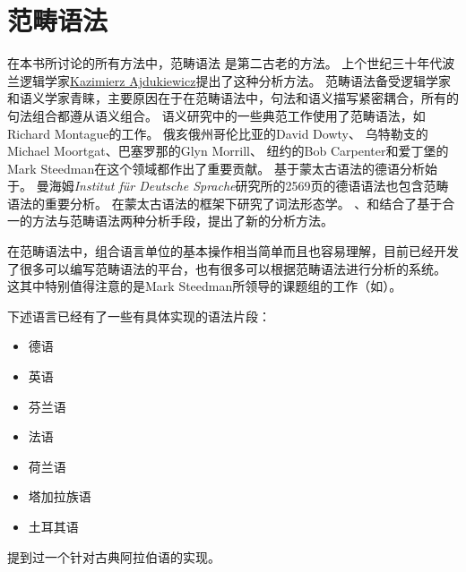 
\chapter{范畴语法}
\label{Kapitel-CG}\label{chap-CG}

在本书所讨论的所有方法中，范畴语法
是第二古老的方法。
上个世纪三十年代波兰逻辑学家\href{http://en.wikipedia.org/wiki/Kazimierz_Ajdukiewicz}{Kazimierz Ajdukiewicz}提出了这种分析方法\citep{Ajdukiewicz35a-u}。
范畴语法备受逻辑学家和语义学家青睐，主要原因在于在范畴语法中，句法和语义描写紧密耦合，所有的句法组合都遵从语义组合。
语义研究中的一些典范工作使用了范畴语法，如Richard Montague\citeyearpar{Montague74a-u}的工作。
俄亥俄州哥伦比亚的David Dowty\citeyearpar{Dowty79a}、 
乌特勒支的Michael Moortgat\citeyearpar{Moortgat89a-u}、巴塞罗那的Glyn Morrill\citeyearpar{Morrill94a-u}、
纽约的Bob Carpenter\citeyearpar{Carpenter98a-u}和爱丁堡的Mark Steedman\citeyearpar{Steedman91a,Steedman97a,Steedman2000a-u}在这个领域都作出了重要贡献。
基于蒙太古语法的德语分析始于。
曼海姆\emph{Institut für Deutsche Sprache}研究所的2569页的德语语法\citep*{IDS97-not-crossreferenced}也包含范畴语法的重要分析。
\citet{Fanselow81a-u}在蒙太古语法的框架下研究了词法形态学。
\citet{Uszkoreit86d}、\citet{Karttunen86a,Karttunen89a-u}和\citet*{CKZ88a}结合了基于合一的方法与范畴语法两种分析手段，提出了新的分析方法。

在范畴语法中，组合语言单位的基本操作相当简单而且也容易理解，目前已经开发了很多可以编写范畴语法的平台，也有很多可以根据范畴语法进行分析的系统\citep*{YK90a-u,Carpenter1994a-u,BvN94a-u,Llore1995a-u,KoenigE99a-u,Moot2002a-u,WB2003a-u,BCPW2007a,Morrill2012a}。
这其中特别值得注意的是Mark Steedman所领导的课题组的工作（如\citealp*{CHS2002a-u,CC2007a-u}）。

下述语言已经有了一些有具体实现的语法片段：
\begin{itemize}
\item 德语\citep*{Uszkoreit86d,KoenigE99a-u,VHE2003a,VTBS2011a}
\item 英语 \citep{Villavicencio2002a,Baldridge2002a-u,Beavers2002a-u,Beavers2004a-u}
\item 芬兰语 \citep{Karttunen89a-u}
\item 法语 \citep*{BBCG87a-u}
\item 荷兰语 \citep{BvN94a-u,Baldridge2002a-u}
\item 塔加拉族语 \citep{Baldridge2002a-u}
\item 土耳其语 \citep{Hoffmann95a-u,Baldridge2002a-u}
\end{itemize}
\citet*[]{BCPW2007a}提到过一个针对古典阿拉伯语的实现。

